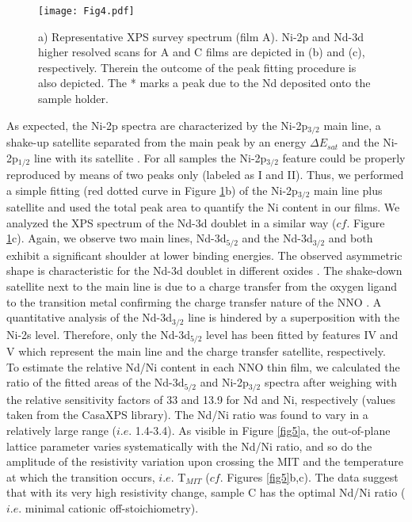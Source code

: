 \documentclass[aip,graphicx,numerical]{revtex4-1}
\begin{document}
\begin{figure}
  \texttt{[image: Fig4.pdf]}
  \caption{a) Representative XPS survey spectrum (film A). Ni-2p and Nd-3d higher resolved scans for A and C films are depicted in (b) and (c), respectively. Therein the outcome of the peak fitting procedure is also depicted. The * marks a peak due to the Nd deposited onto the sample holder. }
  \label{fig4}
\end{figure}
As expected, the Ni-2p spectra are characterized by the Ni-2p$_{3/2}$ main line, a shake-up satellite separated from the main peak by an energy $\Delta E_{sat}$ and the Ni-2p$_{1/2}$ line with its satellite \cite{Mizokawa_1995, Barman_1994} . For all samples the Ni-2p$_{3/2}$ feature could be properly reproduced by means of two peaks only (labeled as I and II). Thus, we performed a simple fitting (red dotted curve in Figure \ref{fig4}b) of the Ni-2p$_{3/2}$ main line plus satellite and used the total peak area to quantify the Ni content in our films. We analyzed the XPS spectrum of the Nd-3d doublet in a similar way ($cf.$ Figure \ref{fig4}c). Again, we observe two main lines, Nd-3d$_{5/2}$ and the Nd-3d$_{3/2}$ and both exhibit a significant shoulder at lower binding energies. The observed asymmetric shape is characteristic for the Nd-3d doublet in different oxides \cite{UWAMINO198467, atukin2008, Iwanowski2013} . The shake-down satellite next to the main line is due to a charge transfer from the oxygen ligand to the transition metal confirming the charge transfer nature of the NNO \cite{Kohiki_1989} . A quantitative analysis of the Nd-3d$_{3/2}$ line is hindered by a superposition with the Ni-2s level. Therefore, only the Nd-3d$_{5/2}$ level has been fitted by features IV and V which represent the main line and the charge transfer satellite, respectively.\\ To estimate the relative Nd/Ni content in each NNO thin film, we calculated the ratio of the fitted areas of the Nd-3d$_{5/2}$ and Ni-2p$_{3/2}$ spectra after weighing with the relative sensitivity factors of 33 and 13.9 for Nd and Ni, respectively (values taken from the CasaXPS library). The Nd/Ni ratio was found to vary in a relatively large range ($i.e.$ 1.4-3.4). As visible in Figure \ref{fig5}a, the out-of-plane lattice parameter varies systematically with the Nd/Ni ratio, and so do the amplitude of the resistivity variation upon crossing the MIT and the temperature at which the transition occurs, $i.e.$ T$_{MIT}$ ($cf.$ Figures \ref{fig5}b,c). The data suggest that with its very high resistivity change, sample C has the optimal Nd/Ni ratio  ($i.e.$ minimal cationic off-stoichiometry).
\end{document}
